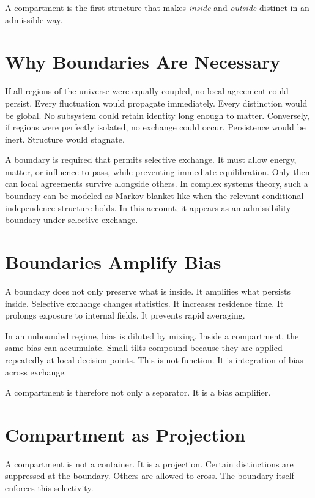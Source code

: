 \documentclass[11pt,twoside,openright]{book}
\begin{document}
A compartment is the first structure that makes \emph{inside} and \emph{outside} distinct in an admissible way.

\section*{Why Boundaries Are Necessary}

If all regions of the universe were equally coupled, no local agreement could persist. Every fluctuation would propagate immediately. Every distinction would be global. No subsystem could retain identity long enough to matter. Conversely, if regions were perfectly isolated, no exchange could occur. Persistence would be inert. Structure would stagnate.

A boundary is required that permits selective exchange. It must allow energy, matter, or influence to pass, while preventing immediate equilibration. Only then can local agreements survive alongside others. In complex systems theory, such a boundary can be modeled as Markov-blanket-like when the relevant conditional-independence structure holds. In this account, it appears as an admissibility boundary under selective exchange.

\section*{Boundaries Amplify Bias}

A boundary does not only preserve what is inside. It amplifies what persists inside. Selective exchange changes statistics. It increases residence time. It prolongs exposure to internal fields. It prevents rapid averaging.

In an unbounded regime, bias is diluted by mixing. Inside a compartment, the same bias can accumulate. Small tilts compound because they are applied repeatedly at local decision points. This is not function. It is integration of bias across exchange.

A compartment is therefore not only a separator. It is a bias amplifier.

\section*{Compartment as Projection}

A compartment is not a container. It is a projection. Certain distinctions are suppressed at the boundary. Others are allowed to cross. The boundary itself enforces this selectivity.
\end{document}
